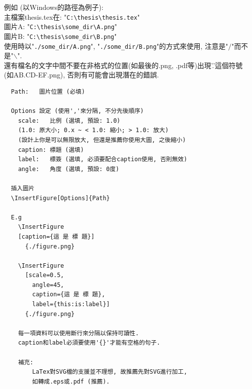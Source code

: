 \noindent 例如 (以Windows的路徑為例子):\\
主檔案thesis.tex在: "\verb|C:\thesis\thesis.tex|"\\
圖片A: "\verb|C:\thesis\some_dir\A.png|"\\
圖片B: "\verb|C:\thesis\some_dir\B.png|"\\
使用時以"\verb|./some_dir/A.png|", "\verb|./some_dir/B.png|"的方式來使用, 注意是"$/$"而不是"$\backslash$".\\

還有檔名的文字中間不要在非格式的位置(如最後的.png, .pdf等)出現'.'這個符號 (如AB.CD-EF.png), 否則有可能會出現潛在的錯誤.

\newpage
{}
  \EmptyLine
  \begin{fmpage}{\textwidth}
  \begin{verbatim}
  Path:   圖片位置 (必填)

  Options 設定 (使用','來分隔, 不分先後順序)
    scale:   比例 (選填, 預設: 1.0)
    (1.0: 原大小; 0.x ~ < 1.0: 縮小; > 1.0: 放大)
    (設計上你是可以無限放大, 但還是推薦你使用大圖, 之後縮小)
    caption: 標題 (選填)
    label:   標簽 (選填, 必須要配合caption使用, 否則無效)
    angle:   角度 (選填, 預設: 0度)

  插入圖片
  \InsertFigure[Options]{Path}

  E.g
    \InsertFigure
    [caption={這 是 標 題}]
      {./figure.png}

    \InsertFigure
      [scale=0.5,
        angle=45,
        caption={這 是 標 題},
        label={this:is:label}]
      {./figure.png}

    每一項資料可以使用斷行來分隔以保持可讀性.
    caption和label必須要使用'{}'才能有空格的句子.

    補充:
        LaTex對SVG檔的支援並不理想, 故推薦先對SVG進行加工,
        如轉成.eps或.pdf (推薦).
  \end{verbatim}
  \end{fmpage}

